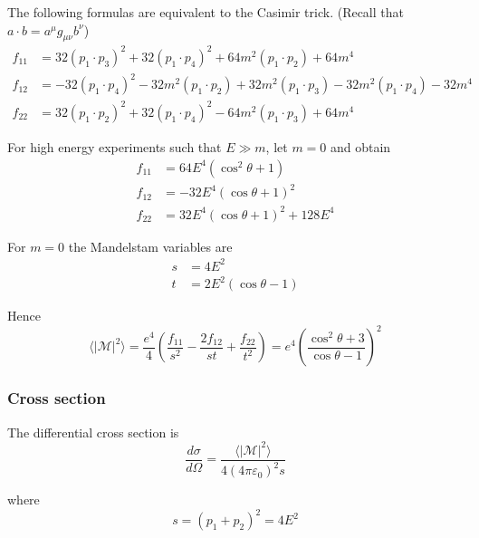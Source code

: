 The following formulas are equivalent to the Casimir trick.
(Recall that $a\cdot b=a^\mu g_{\mu\nu}b^\nu$)
\begin{align*}
f_{11}&=
32(p_1\cdot p_3)^2
+32(p_1\cdot p_4)^2
+64 m^2(p_1\cdot p_2)
+64 m^4
\\
f_{12}&=
-32 (p_1\cdot p_4)^2
-32 m^2 (p_1\cdot p_2)
+32 m^2 (p_1\cdot p_3)
-32 m^2 (p_1\cdot p_4)
-32 m^4
\\
f_{22}&=
32(p_1\cdot p_2)^2
+32(p_1\cdot p_4)^2
-64 m^2(p_1\cdot p_3)
+64 m^4
\end{align*}

\iffalse
In terms of Mandelstam variables
\begin{align*}
f_{11} &= 8 t^2 + 8 u^2 - 64 t m^2 - 64 u m^2 + 192 m^4
\\
f_{12} &= -8 u^2 + 64 u m^2 - 96 m^4
\\
f_{22} &= 8 s^2 + 8 u^2 - 64 s m^2 - 64 u m^2 + 192 m^4
\end{align*}
\fi

For high energy experiments such that $E\gg m$, let $m=0$ and obtain
\begin{align*}
f_{11}&=64E^4(\cos^2\theta+1)
\\
f_{12}&=-32E^4(\cos\theta+1)^2
\\
f_{22}&=32E^4(\cos\theta+1)^2+128E^4
\end{align*}

For $m=0$ the Mandelstam variables are
\begin{align*}
s&=4E^2
\\
t&=2E^2(\cos\theta-1)
\end{align*}

Hence
\begin{equation*}
\langle|\mathcal{M}|^2\rangle
=\frac{e^4}{4}
\left(
\frac{f_{11}}{s^2}-\frac{2f_{12}}{st}+\frac{f_{22}}{t^2}
\right)
=e^4
\left(
\frac{\cos^2\theta+3}{\cos\theta-1}
\right)^2
\end{equation*}

\subsubsection*{Cross section}
The differential cross section is
\begin{equation*}
\frac{d\sigma}{d\Omega}=\frac{\langle|\mathcal{M}|^2\rangle}{4(4\pi\varepsilon_0)^2s}
\end{equation*}

where
\begin{equation*}
s=(p_1+p_2)^2=4E^2
\end{equation*}

